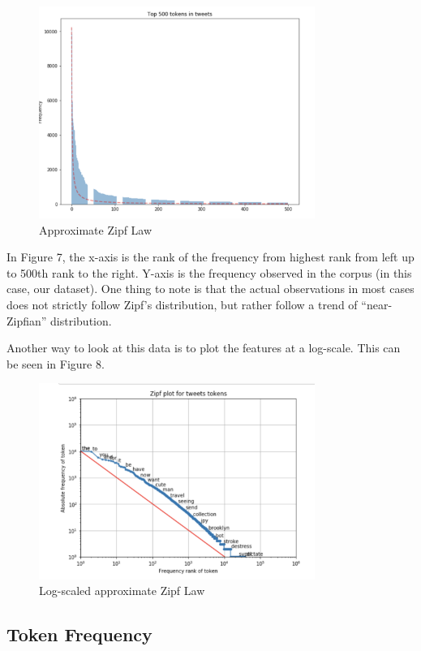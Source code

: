 \documentclass{article}
\begin{document}
	\begin{figure}[h]
		\label{Figure 7}
		\caption{Approximate Zipf Law}
		\includegraphics[width=9cm]{zipf.png}
		\centering
	\end{figure}
	
	
	In Figure 7, the x-axis is the rank of the frequency from highest rank from left up to 500th rank to the right. Y-axis is the frequency observed in the corpus (in this case, our dataset). One thing to note is that the actual observations in most cases does not strictly follow Zipf’s distribution, but rather follow a trend of “near-Zipfian” distribution.
	
	Another way to look at this data is to plot the features at a log-scale. This can be seen in Figure 8.
	
	\begin{figure}[h]
		\label{Figure 8}
		\caption{Log-scaled approximate Zipf Law}
		\includegraphics[width=9cm]{logzipf.png}
		\centering
	\end{figure}
	
	\subsection{Token Frequency}
	
\end{document}
